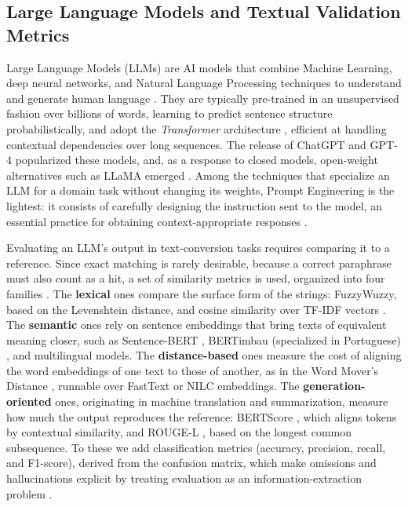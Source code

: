\documentclass[a4paper,fleqn]{cas-sc}
\begin{document}
\subsection{Large Language Models and Textual Validation Metrics}\label{sec:llm-metrics}
Large Language Models (LLMs) are AI models that combine Machine Learning, deep neural networks, and Natural Language Processing techniques to understand and generate human language \citep{touvron2023}. They are typically pre-trained in an unsupervised fashion over billions of words, learning to predict sentence structure probabilistically, and adopt the \textit{Transformer} architecture \citep{vaswani2017}, efficient at handling contextual dependencies over long sequences. The release of ChatGPT and GPT-4 \citep{openai2024} popularized these models, and, as a response to closed models, open-weight alternatives such as LLaMA emerged \citep{touvron2023,llama3}. Among the techniques that specialize an LLM for a domain task without changing its weights, Prompt Engineering is the lightest: it consists of carefully designing the instruction sent to the model, an essential practice for obtaining context-appropriate responses \citep{brown2020}.

Evaluating an LLM's output in text-conversion tasks requires comparing it to a reference. Since exact matching is rarely desirable, because a correct paraphrase must also count as a hit, a set of similarity metrics is used, organized into four families \citep{jurafsky2009}. The \textbf{lexical} ones compare the surface form of the strings: FuzzyWuzzy, based on the Levenshtein distance, and cosine similarity over TF-IDF vectors \citep{manning2008}. The \textbf{semantic} ones rely on sentence embeddings that bring texts of equivalent meaning closer, such as Sentence-BERT \citep{reimers2019}, BERTimbau (specialized in Portuguese) \citep{souza2020}, and multilingual models. The \textbf{distance-based} ones measure the cost of aligning the word embeddings of one text to those of another, as in the Word Mover's Distance \citep{kusner2015}, runnable over FastText \citep{bojanowski2017} or NILC embeddings. The \textbf{generation-oriented} ones, originating in machine translation and summarization, measure how much the output reproduces the reference: BERTScore \citep{zhang2020bertscore}, which aligns tokens by contextual similarity, and ROUGE-L \citep{lin2004rouge}, based on the longest common subsequence. To these we add classification metrics (accuracy, precision, recall, and F1-score), derived from the confusion matrix, which make omissions and hallucinations explicit by treating evaluation as an information-extraction problem \citep{manning2008}.
\end{document}

